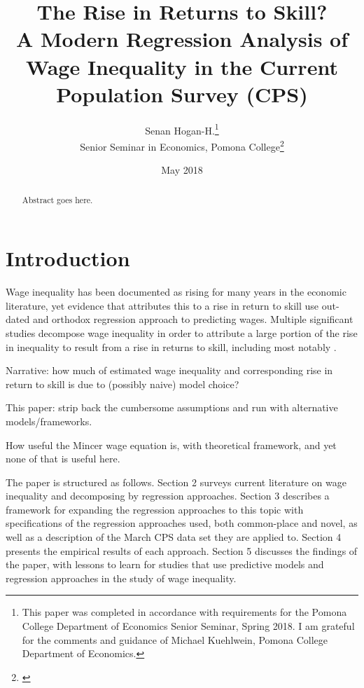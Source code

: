 \documentclass[notitlepage,12pt]{article}
\author{Senan Hogan-H.\footnote{This paper was completed in accordance with requirements for the Pomona College Department of Economics Senior Seminar, Spring 2018.  I am grateful for the comments and guidance of Michael Kuehlwein, Pomona College Department of Economics.} \\ Senior Seminar in Economics, Pomona College\footnote{\href{https://github.com/shoganhennessy/ECON190}{\color{blue}{\underline{This project's Github repository, which hosts all contributing materials, is available here.}}}}}
\title{The Rise in Returns to Skill? \\ \Large{A Modern Regression Analysis of Wage Inequality in the Current Population Survey (CPS)}}
\date{May 2018}
\begin{document}
\maketitle
\thispagestyle{empty}
\begin{abstract}
Abstract goes here.
\end{abstract}

\newpage
\setcounter{page}{1}

\section{Introduction}
Wage inequality has been documented as rising for many years in the economic literature, yet evidence that attributes this to a rise in return to skill use out-dated and orthodox regression approach to predicting wages.  Multiple significant studies decompose wage inequality in order to attribute a large portion of the rise in inequality to result from a rise in returns to skill, including most notably \cite{juhn1993wage}.

Narrative: how much of estimated wage inequality and corresponding rise in return to skill is due to (possibly naive) model choice?  

This paper: strip back the cumbersome assumptions and run with alternative models/frameworks.

How useful the Mincer wage equation is, with theoretical framework, and yet none of that is useful here.

The paper is structured as follows.  Section 2 surveys current literature on wage inequality and decomposing by regression approaches.  Section 3 describes a framework for expanding the regression approaches to this topic with specifications of the regression approaches used, both common-place and novel, as well as a description of the March CPS data set they are applied to.  Section 4 presents the empirical results of each approach.  Section 5 discusses the findings of the paper, with lessons to learn for studies that use predictive models and regression approaches in the study of wage inequality.

\end{document}
